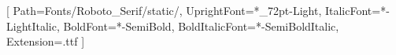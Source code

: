 \usepackage{fontspec}

\setmainfont{RobotoSerif}[%
  Path=Fonts/Roboto_Serif/static/,
  UprightFont={*_72pt-Light},    %
  ItalicFont={*-LightItalic}, %
  BoldFont={*-SemiBold},        %
  BoldItalicFont={*-SemiBoldItalic},    %
  Extension=.ttf
]

\newfontfamily{}




